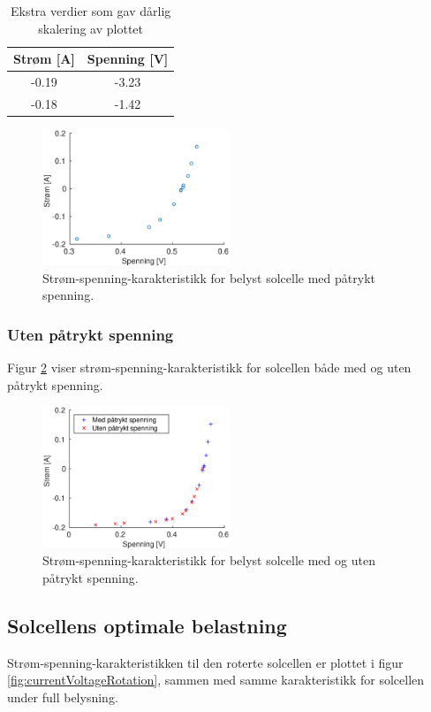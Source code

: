 \documentclass[a4paper,11pt, twocolumn]{article}
\begin{document}
\begin{table}[!ht]
\centering
	\caption{Ekstra verdier som gav dårlig skalering av plottet}
	\label{tab:ekstra}
	\begin{tabular}{cc}
		\toprule
		\toprule
		Strøm [A] & Spenning [V]\\
		\hline
		-0.19 & -3.23\\
		-0.18 & -1.42\\
		\toprule
	\end{tabular}
\end{table}

\begin{figure}[!ht]
	\includegraphics[width = 0.5\textwidth]{matlab/LAB/belystMedSpenning.eps}
	\caption{Strøm-spenning-karakteristikk for belyst solcelle med påtrykt spenning.}
	\label{fig:resMedSpenning}
\end{figure}

\subsubsection{Uten påtrykt spenning}
Figur \ref{fig:resUtenSpenning} viser strøm-spenning-karakteristikk for solcellen både med og uten påtrykt spenning.
\begin{figure}[!ht]
	\includegraphics[width = 0.5\textwidth]{matlab/LAB/utenSpenning.eps}
	\caption{Strøm-spenning-karakteristikk for belyst solcelle med og uten påtrykt spenning.}
	\label{fig:resUtenSpenning}
\end{figure}

\subsection{Solcellens optimale belastning}
Strøm-spenning-karakteristikken til den roterte solcellen er plottet i figur \ref{fig:currentVoltageRotation}, sammen med samme karakteristikk for solcellen under full belysning. 
\end{document}
